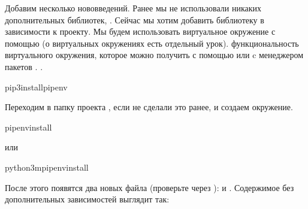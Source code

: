 \documentclass[letterpaper,10pt,russian]{sphinxmanual}
\begin{document}
\sphinxAtStartPar
Добавим несколько нововведений. Ранее мы не использовали никаких дополнительных библиотек, . Сейчас мы хотим добавить библиотеку  в зависимости к проекту. Мы будем использовать виртуальное окружение с помощью  (о виртуальных окружениях есть отдельный урок).   функциональность виртуального окружения, которое можно получить с помощью  или  c менеджером пакетов . .

\begin{sphinxVerbatim}[commandchars=\\\{\}]
pip3installpipenv
\end{sphinxVerbatim}

\sphinxAtStartPar
Переходим в папку проекта , если не сделали это ранее, и создаем окружение.

\begin{sphinxVerbatim}[commandchars=\\\{\}]
pipenvinstall
\end{sphinxVerbatim}

\sphinxAtStartPar
или

\begin{sphinxVerbatim}[commandchars=\\\{\}]
python3\PYGZhy{}mpipenvinstall
\end{sphinxVerbatim}

\sphinxAtStartPar
После этого появятся два новых файла (проверьте через ):  и . Содержимое  без дополнительных зависимостей выглядит так:
\end{document}
